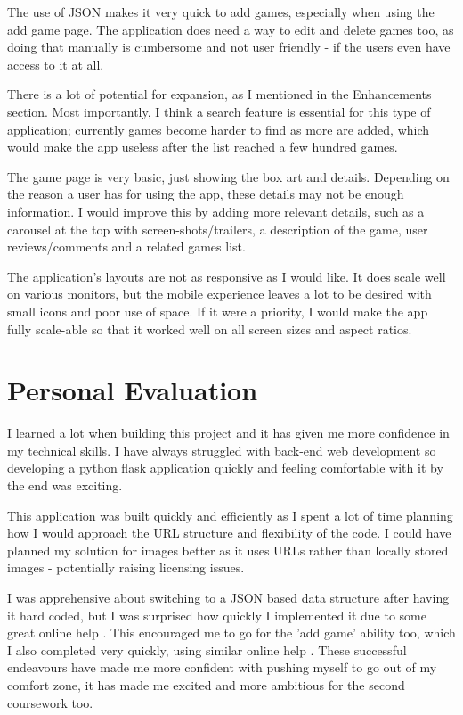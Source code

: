 \documentclass[10pt, a4paper]{article}
\begin{document}
	The use of JSON makes it very quick to add games, especially when using the add game page. The application does need a way to edit and delete games too, as doing that manually is cumbersome and not user friendly - if the users even have access to it at all.
	
	There is a lot of potential for expansion, as I mentioned in the Enhancements section. Most importantly, I think a search feature is essential for this type of application; currently games become harder to find as more are added, which would make the app useless after the list reached a few hundred games.
	
	The game page is very basic, just showing the box art and details. Depending on the reason a user has for using the app, these details may not be enough information. I would improve this by adding more relevant details, such as a carousel at the top with screen-shots/trailers, a description of the game, user reviews/comments and a related games list.
	
	The application's layouts are not as responsive as I would like. It does scale well on various monitors, but the mobile experience leaves a lot to be desired with small icons and poor use of space. If it were a priority, I would make the app fully scale-able so that it worked well on all screen sizes and aspect ratios.
	
	\section{Personal Evaluation}
	
	I learned a lot when building this project and it has given me more confidence in my technical skills. I have always struggled with back-end web development so developing a python flask application quickly and feeling comfortable with it by the end was exciting.
	
	This application was built quickly and efficiently as I spent a lot of time planning how I would approach the URL structure and flexibility of the code. I could have planned my solution for images better as it uses URLs rather than locally stored images - potentially raising licensing issues.
	
	I was apprehensive about switching to a JSON based data structure after having it hard coded, but I was surprised how quickly I implemented it due to some great online help \cite{ReadingJson}. This encouraged me to go for the 'add game' ability too, which I also completed very quickly, using similar online help \cite{UpdatingJson}. These successful endeavours have made me more confident with pushing myself to go out of my comfort zone, it has made me excited and more ambitious for the second coursework too.
	
\end{document}
